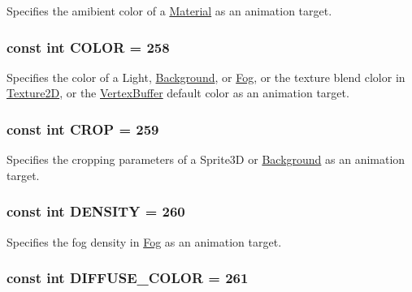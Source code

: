 Specifies the amibient color of a \hyperlink{classm3g_1_1Material}{Material} as an animation target. \hypertarget{classm3g_1_1AnimationTrack_a6d8034c897057de595a4511a4e7a837}{
\subsubsection[{COLOR}]{\setlength{\rightskip}{0pt plus 5cm}const int {\bf COLOR} = 258}}
\label{classm3g_1_1AnimationTrack_a6d8034c897057de595a4511a4e7a837}


Specifies the color of a Light, \hyperlink{classm3g_1_1Background}{Background}, or \hyperlink{classm3g_1_1Fog}{Fog}, or the texture blend clolor in \hyperlink{classm3g_1_1Texture2D}{Texture2D}, or the \hyperlink{classm3g_1_1VertexBuffer}{VertexBuffer} default color as an animation target. \hypertarget{classm3g_1_1AnimationTrack_91fa562078e577c24d06faf8391b34fe}{
\subsubsection[{CROP}]{\setlength{\rightskip}{0pt plus 5cm}const int {\bf CROP} = 259}}
\label{classm3g_1_1AnimationTrack_91fa562078e577c24d06faf8391b34fe}


Specifies the cropping parameters of a Sprite3D or \hyperlink{classm3g_1_1Background}{Background} as an animation target. \hypertarget{classm3g_1_1AnimationTrack_7d0fe4463930d4a4b24fc47660561899}{
\subsubsection[{DENSITY}]{\setlength{\rightskip}{0pt plus 5cm}const int {\bf DENSITY} = 260}}
\label{classm3g_1_1AnimationTrack_7d0fe4463930d4a4b24fc47660561899}


Specifies the fog density in \hyperlink{classm3g_1_1Fog}{Fog} as an animation target. \hypertarget{classm3g_1_1AnimationTrack_9631242a611cf95d697c25064dba7c4f}{
\subsubsection[{DIFFUSE\_\-COLOR}]{\setlength{\rightskip}{0pt plus 5cm}const int {\bf DIFFUSE\_\-COLOR} = 261}}
\label{classm3g_1_1AnimationTrack_9631242a611cf95d697c25064dba7c4f}


